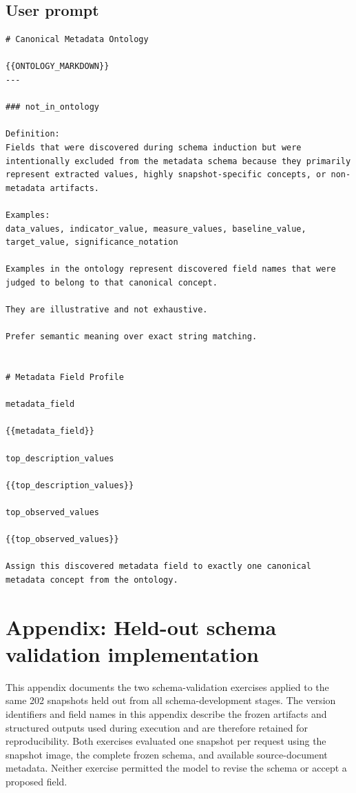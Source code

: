 \documentclass{article}
\begin{document}
\subsection{User prompt}

\begin{lstlisting}
# Canonical Metadata Ontology

{{ONTOLOGY_MARKDOWN}}
---

### not_in_ontology

Definition:
Fields that were discovered during schema induction but were intentionally excluded from the metadata schema because they primarily represent extracted values, highly snapshot-specific concepts, or non-metadata artifacts.

Examples:
data_values, indicator_value, measure_values, baseline_value, target_value, significance_notation

Examples in the ontology represent discovered field names that were judged to belong to that canonical concept.

They are illustrative and not exhaustive.

Prefer semantic meaning over exact string matching.


# Metadata Field Profile

metadata_field

{{metadata_field}}

top_description_values

{{top_description_values}}

top_observed_values

{{top_observed_values}}

Assign this discovered metadata field to exactly one canonical metadata concept from the ontology.
\end{lstlisting}

\section{Appendix: Held-out schema validation implementation}
\label{appendix:schema_validation}

This appendix documents the two schema-validation exercises applied to the same 202 snapshots held out from all schema-development stages. The version identifiers and field names in this appendix describe the frozen artifacts and structured outputs used during execution and are therefore retained for reproducibility. Both exercises evaluated one snapshot per request using the snapshot image, the complete frozen schema, and available source-document metadata. Neither exercise permitted the model to revise the schema or accept a proposed field.
\end{document}
